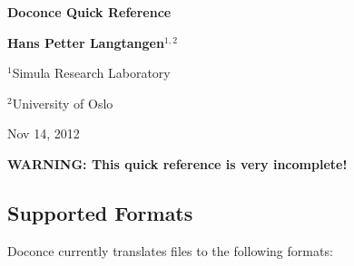 \documentclass[twoside]{article}
\begin{document}





\begin{center}
{\LARGE\bf Doconce Quick Reference}
\end{center}





\begin{center}
{\bf Hans Petter Langtangen${}^{1, 2}$} \\ [0mm]
\end{center}

\begin{center}
\centerline{{\small ${}^1$Simula Research Laboratory}}
\centerline{{\small ${}^2$University of Oslo}}
\end{center}





\begin{center}
Nov 14, 2012
\end{center}

\vspace{1cm}



\tableofcontents

\vspace{1cm} %






\textbf{WARNING: This quick reference is very incomplete!}

\subsection{Supported Formats}

Doconce currently translates files to the following formats:
\end{document}
